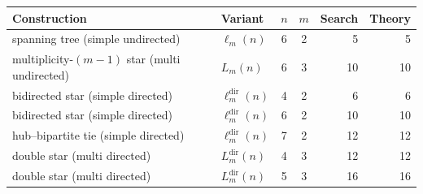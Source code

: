 \begin{tabular}{llccrr}
\toprule
Construction & Variant & $n$ & $m$ & Search & Theory \\
\midrule
spanning tree (simple undirected) & $\ell_m(n)$ & 6 & 2 & 5 & 5 \\
multiplicity-$(m{-}1)$ star (multi undirected) & $L_m(n)$ & 6 & 3 & 10 & 10 \\
bidirected star (simple directed) & $\ell_m^{\mathrm{dir}}(n)$ & 4 & 2 & 6 & 6 \\
bidirected star (simple directed) & $\ell_m^{\mathrm{dir}}(n)$ & 6 & 2 & 10 & 10 \\
hub--bipartite tie (simple directed) & $\ell_m^{\mathrm{dir}}(n)$ & 7 & 2 & 12 & 12 \\
double star (multi directed) & $L_m^{\mathrm{dir}}(n)$ & 4 & 3 & 12 & 12 \\
double star (multi directed) & $L_m^{\mathrm{dir}}(n)$ & 5 & 3 & 16 & 16 \\
\bottomrule
\end{tabular}
